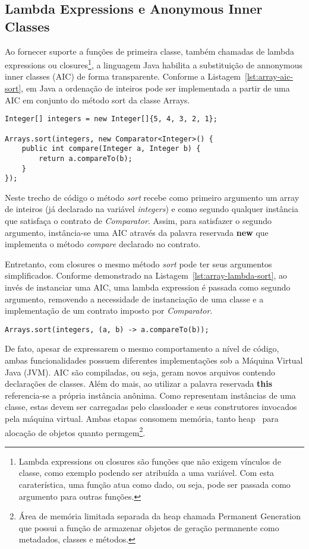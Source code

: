\documentclass[10pt, conference]{IEEEtran}
\begin{document}
\subsection{Lambda Expressions e Anonymous Inner Classes}
Ao fornecer suporte a funções de primeira classe, também chamadas de lambda expressions ou closures\footnote{Lambda expressions ou closures são funções que não exigem vínculos de classe, como exemplo podendo ser atribuída a uma variável. Com esta caraterística, uma função atua como dado, ou seja, pode ser passada como argumento para outras funções.}, a linguagem Java habilita a substituição de annonymous inner classes (AIC) de forma transparente. Conforme a Listagem~\ref{lst:array-aic-sort}, em Java a ordenação de inteiros pode ser implementada a partir de uma AIC em conjunto do método sort da classe Arrays.

\begin{lstlisting}[caption={Sort - Anonymous Inner Class}, label={lst:array-aic-sort}]
Integer[] integers = new Integer[]{5, 4, 3, 2, 1};

Arrays.sort(integers, new Comparator<Integer>() {
    public int compare(Integer a, Integer b) {
        return a.compareTo(b);
    }
});
\end{lstlisting}

Neste trecho de código o método \textit{sort} recebe como primeiro argumento um array de inteiros (já declarado na variável \textit{integers}) e como segundo qualquer instância que satisfaça o contrato de \textit{Comparator}. Assim, para satisfazer o segundo argumento, instância-se uma AIC através da palavra reservada \textbf{new} que implementa o método \textit{compare} declarado no contrato.

Entretanto, com closures o mesmo método \textit{sort} pode ter seus argumentos simplificados. Conforme demonstrado na Listagem~\ref{lst:array-lambda-sort}, ao invés de instanciar uma AIC, uma lambda expression é passada como segundo argumento, removendo a necessidade de instanciação de uma classe e a implementação de um contrato imposto por \textit{Comparator}.

\begin{lstlisting}[caption={Sort - Lambda Expression}, label={lst:array-lambda-sort}]
Arrays.sort(integers, (a, b) -> a.compareTo(b));
\end{lstlisting}

De fato, apesar de expressarem o mesmo comportamento a nível de código, ambas funcionalidades possuem diferentes implementações sob a Máquina Virtual Java (JVM). AIC são compiladas, ou seja, geram novos arquivos contendo declarações de classes. Além do mais, ao utilizar a palavra reservada \textbf{this} referencia-se a própria instância anônima. Como representam instâncias de uma classe, estas devem ser carregadas pelo classloader e seus construtores invocados pela máquina virtual. Ambas etapas consomem memória, tanto heap~\cite{hunt2011java} para alocação de objetos quanto permgem\footnote{Área de memória limitada separada da heap chamada Permanent Generation que possui a função de armazenar objetos de geração permanente como metadados, classes e métodos.}.
\end{document}

